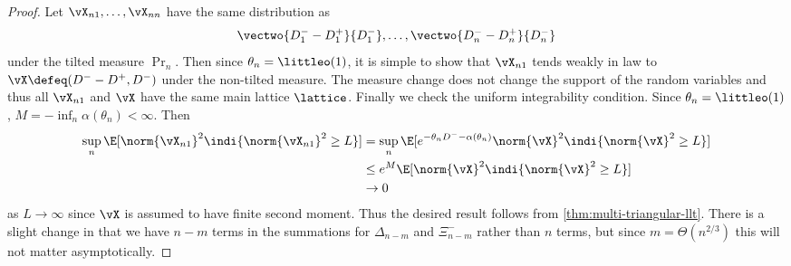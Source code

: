 \begin{proof}
    Let $\vX_{n1}, \ldots, \vX_{nn}$ have the same distribution as 
    \begin{equation*}
        \vectwo{D^-_1 - D^+_1}{D^-_1}, \ldots, \vectwo{D^-_n - D^+_n}{D^-_n}
    \end{equation*}
    under the tilted measure $\Pr_n$. Then since $\theta_n = \littleo(1)$, it is simple to show that $\vX_{n1}$ tends weakly in law to $\vX \defeq (D^- - D^+, D^-)$ under the non-tilted measure. The measure change does not change the support of the random variables and thus all $\vX_{n1}$ and $\vX$ have the same main lattice $\lattice$. Finally we check the uniform integrability condition. Since $\theta_n = \littleo(1)$, $M = - \inf_n \alpha(\theta_n) < \infty$. Then
    \begin{align*}
        \sup_n \E[\norm{\vX_{n1}}^2 \indi \{ \norm{\vX_{n1}}^2 \geq L \} ]
        &= \sup_n \E[e^{-\theta_n D^- - \alpha(\theta_n)} \norm{\vX}^2 \indi\{\norm{\vX}^2 \geq L \} ] \\
        &\leq e^M \E[\norm{\vX}^2 \indi\{\norm{\vX}^2 \geq L \} ] \\
        & \to 0
    \end{align*}
    as $L \to \infty$ since $\vX$ is assumed to have finite second moment. Thus the desired result follows from \cref{thm:multi-triangular-llt}. There is a slight change in that we have $n - m$ terms in the summations for $\Delta_{n-m}$ and $\Xi^-_{n-m}$ rather than $n$ terms, but since $m = \Theta(n^{2/3})$ this will not matter asymptotically.
\end{proof}

